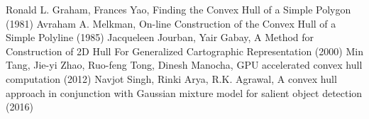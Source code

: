 \begin{thebibliography}{9}
    Ronald L. Graham, Frances Yao, Finding the Convex Hull of a Simple Polygon (1981)
    Avraham A. Melkman, On-line Construction of the Convex Hull of a Simple Polyline (1985)
    Jacqueleen Jourban, Yair Gabay, A Method for Construction of 2D Hull For Generalized Cartographic Representation (2000)
    Min Tang, Jie-yi Zhao, Ruo-feng Tong, Dinesh Manocha, GPU accelerated convex hull computation (2012)
    Navjot Singh, Rinki Arya, R.K. Agrawal, A convex hull approach in conjunction with Gaussian mixture model for salient object detection (2016)
\end{thebibliography}